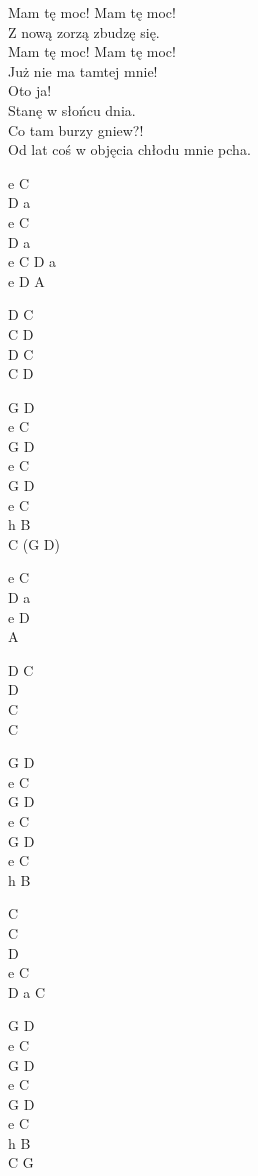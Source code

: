 \begin{text}
    Mam tę moc! Mam tę moc!\\
    Z nową zorzą zbudzę się.\\
    Mam tę moc! Mam tę moc!\\
    Już nie ma tamtej mnie!\\
    Oto ja!\\
    Stanę w słońcu dnia.\\
    Co tam burzy gniew?!\\
    Od lat coś w objęcia chłodu mnie pcha.
\end{text}
\begin{chord}
    e C\\
    D a\\
    e C\\
    D a\\
    e C D a\\
    e D	A

    D C\\
    C D\\
    D C\\
    C D

    G D\\
    e C\\
    G D\\
    e C\\      
    G D\\
    e C\\
    h B\\
    C (G D)

    e C\\
    D a\\
    e D\\
    A

    D C\\
    D\\
    C\\
    C

    G D\\
    e C\\
    G D\\
    e C\\
    G D\\
    e C\\
    h B

    C\\
    C\\
    D\\
    e C\\
    D a C

    G D\\
    e C\\
    G D\\
    e C\\
    G D\\
    e C\\
    h B\\
    C G
\end{chord}